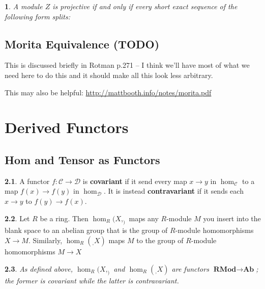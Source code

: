 \documentclass[oneside,english]{amsbook}
\numberwithin{section}{chapter}
\theoremstyle{plain}
\newtheorem{thm}{\protect\theoremname}
\theoremstyle{definition}
\newtheorem{defn}[thm]{\protect\definitionname}
\providecommand{\definitionname}{Definition}
\providecommand{\theoremname}{Theorem}
\begin{document}
			\begin{thm}
				A module $Z$ is projective if and only if every short exact sequence of the following form splits:
				
				\begin{center}
				\end{center}				
			\end{thm}
			
		\section{Morita Equivalence (TODO)}
		
			This is discussed briefly in Rotman p.271 -- I think we'll have most of what we need here to do this and it should make all this look less arbitrary.
			
			This may also be helpful: \url{http://mattbooth.info/notes/morita.pdf}
		
	\chapter{Derived Functors}
	
		\section{Hom and Tensor as Functors}

			\begin{defn}
				A functor $f:\mathscr{C}\to \mathscr{D}$ is \textbf{covariant} if it send every map $x\to y$ in $\hom_\mathscr{C}$ to a map $f(x)\to f(y)$ in $\hom_\mathscr{D}$. It is instead \textbf{contravariant} if it sends each  $x\to y$ to $f(y)\to f(x)$.
			\end{defn}
			
			\begin{defn}
				Let $R$ be a ring. Then $\hom_R(X, _)$ maps any $R$-module $M$ you insert into the blank space to an abelian group that is the group of $R$-module homomorphisms $X\to M$. Similarly, $\hom_R(_, X)$ maps $M$ to the group of $R$-module homomorphisms $M\to X$
			\end{defn}
			
			\begin{thm}
				As defined above, $\hom_R(X, _)$ and $\hom_R(_, X)$ are functors $\textbf{RMod}\to \textbf{Ab}$; the former is covariant while the latter is contravariant.
			\end{thm}
			
\end{document}
